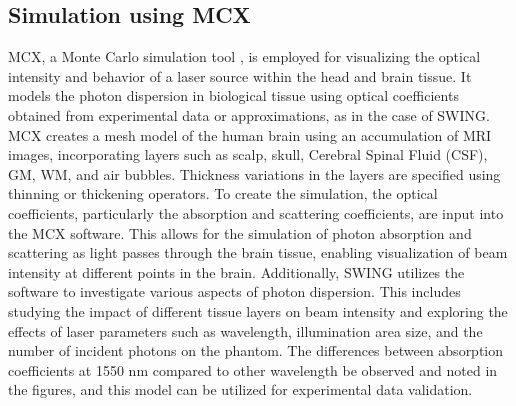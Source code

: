 \documentclass[journal,twoside,web]{ieeecolor}
\begin{document}
\subsection{Simulation using MCX}
MCX, a Monte Carlo simulation tool \cite{b6}, is employed for visualizing the optical intensity and behavior of a laser source within the head and brain tissue. 
It models the photon dispersion in biological tissue using optical coefficients obtained from experimental data or approximations, as in the case of SWING. 
MCX creates a mesh model of the human brain using an accumulation of MRI images, incorporating layers such as scalp, skull, Cerebral Spinal Fluid (CSF), GM, WM, 
and air bubbles. Thickness variations in the layers are specified using thinning or thickening operators. To create the simulation, the optical coefficients, 
particularly the absorption and scattering coefficients, are input into the MCX software. This allows for the simulation of photon absorption and scattering as 
light passes through the brain tissue, enabling visualization of beam intensity at different points in the brain. Additionally, SWING utilizes the software to 
investigate various aspects of photon dispersion. This includes studying the impact of different tissue layers on beam intensity and exploring the effects of 
laser parameters such as wavelength, illumination area size, and the number of incident photons on the phantom. The differences between absorption coefficients at 
1550 nm compared to other wavelength be observed and noted in the figures, and this model can be utilized for experimental data validation.
\end{document}
